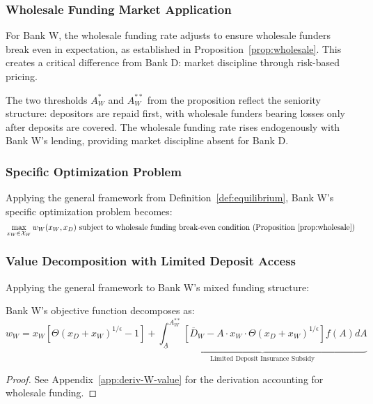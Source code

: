 \documentclass[12pt]{article}
\begin{document}
\subsubsection{Wholesale Funding Market Application}
For Bank W, the wholesale funding rate adjusts to ensure wholesale funders break even in expectation, as established in Proposition~\ref{prop:wholesale}. This creates a critical difference from Bank D: market discipline through risk-based pricing.

The two thresholds $A_{W}^{*}$ and $A_{W}^{**}$ from the proposition reflect the seniority structure: depositors are repaid first, with wholesale funders bearing losses only after deposits are covered. The wholesale funding rate rises endogenously with Bank W's lending, providing market discipline absent for Bank D.

\subsubsection{Specific Optimization Problem}
Applying the general framework from Definition~\ref{def:equilibrium}, Bank W's specific optimization problem becomes:
\begin{equation}
    \max_{x_{W} \in \mathcal{X}_W} w_{W}(x_{W},x_{D}) \text{ subject to wholesale funding break-even condition (Proposition~\ref{prop:wholesale})}
\end{equation}

\subsubsection{Value Decomposition with Limited Deposit Access}
Applying the general framework to Bank W's mixed funding structure:

\begin{corollary}
Bank W's objective function decomposes as:
\begin{equation}
    w_{W} = x_{W}[\Theta(x_{D}+x_{W})^{1/\epsilon}-1] + \underbrace{\int_{\underline{A}}^{A_{W}^{**}}[\overline{D}_{W} - A \cdot x_{W} \cdot \Theta(x_{D}+x_{W})^{1/\epsilon}]f(A)dA}_{\text{Limited Deposit Insurance Subsidy}}
\end{equation}
\end{corollary}

\begin{proof}
See Appendix~\ref{app:deriv-W-value} for the derivation accounting for wholesale funding.
\end{proof}
\end{document}
